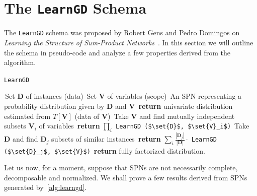 \documentclass{amsart}
\theoremstyle{plain}
\numberwithin{equation}{section}
\newcommand{\set}[1]{\mathbf{#1}}
\newcommand{\code}[1]{\lstinline[mathescape=true]{#1}}
\newcommand{\mcode}[1]{\lstinline[mathescape]!#1!}
\begin{document}
\section{The \code{LearnGD} Schema}

The \code{LearnGD} schema was proposed by Robert Gens and Pedro Domingos on \textit{Learning the
Structure of Sum-Product Networks}~\cite{gens-domingos}. In this section we will outline the schema
in pseudo-code and analyze a few properties derived from the algorithm.

\begin{algorithm}[H]
  \caption{\code{LearnGD}}\label{alg:learngd}
  \begin{algorithmic}[1]
    \Require\,Set $\mathbf{D}$ of instances (data)
    \Require\,Set $\mathbf{V}$ of variables (scope)
    \Ensure\,An SPN representing a probability distribution given by $\mathbf{D}$ and $\mathbf{V}$
    \If{$|\set{V}|=1$} 
      \State\,\textbf{return} univariate distribution estimated from $T[\set{V}]$ (data of
        $\set{V}$)
    \EndIf%
    \State\,Take $\set{V}$ and find mutually independent subsets $\set{V}_i$ of variables
     
      \State\,\textbf{return} $\prod_i$ \mcode{LearnGD ($\set{D}$, $\set{V}_i$)}
    \Else{}
      \State\,Take $\set{D}$ and find $\set{D}_j$ subsets of similar instances
        \State\,\textbf{return} $\sum_i \frac{|\set{D}_j|}{|\set{D}|} \cdot$ \mcode{LearnGD
        ($\set{D}_j$, $\set{V}$)}
      \Else{}
        \State\,\textbf{return} fully factorized distribution.
      \EndIf%
    \EndIf%
  \end{algorithmic}
\end{algorithm}

Let us now, for a moment, suppose that SPNs are not necessarily complete, decomposable and
normalized. We shall prove a few results derived from SPNs generated by~\autoref{alg:learngd}.
\end{document}
